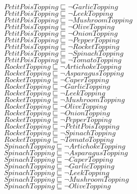 \documentclass[a4paper,10pt]{article}
\begin{document}
 $PetitPoisTopping \sqsubseteq  \lnot GarlicTopping$\\ 
 $PetitPoisTopping \sqsubseteq  \lnot LeekTopping$\\ 
 $PetitPoisTopping \sqsubseteq  \lnot MushroomTopping$\\ 
 $PetitPoisTopping \sqsubseteq  \lnot OliveTopping$\\ 
 $PetitPoisTopping \sqsubseteq  \lnot OnionTopping$\\ 
 $PetitPoisTopping \sqsubseteq  \lnot PepperTopping$\\ 
 $PetitPoisTopping \sqsubseteq  \lnot RocketTopping$\\ 
 $PetitPoisTopping \sqsubseteq  \lnot SpinachTopping$\\ 
 $PetitPoisTopping \sqsubseteq  \lnot TomatoTopping$\\ 
 $RocketTopping \sqsubseteq  \lnot ArtichokeTopping$\\ 
 $RocketTopping \sqsubseteq  \lnot AsparagusTopping$\\ 
 $RocketTopping \sqsubseteq  \lnot CaperTopping$\\ 
 $RocketTopping \sqsubseteq  \lnot GarlicTopping$\\ 
 $RocketTopping \sqsubseteq  \lnot LeekTopping$\\ 
 $RocketTopping \sqsubseteq  \lnot MushroomTopping$\\ 
 $RocketTopping \sqsubseteq  \lnot OliveTopping$\\ 
 $RocketTopping \sqsubseteq  \lnot OnionTopping$\\ 
 $RocketTopping \sqsubseteq  \lnot PepperTopping$\\ 
 $RocketTopping \sqsubseteq  \lnot PetitPoisTopping$\\ 
 $RocketTopping \sqsubseteq  \lnot SpinachTopping$\\ 
 $RocketTopping \sqsubseteq  \lnot TomatoTopping$\\ 
 $SpinachTopping \sqsubseteq  \lnot ArtichokeTopping$\\ 
 $SpinachTopping \sqsubseteq  \lnot AsparagusTopping$\\ 
 $SpinachTopping \sqsubseteq  \lnot CaperTopping$\\ 
 $SpinachTopping \sqsubseteq  \lnot GarlicTopping$\\ 
 $SpinachTopping \sqsubseteq  \lnot LeekTopping$\\ 
 $SpinachTopping \sqsubseteq  \lnot MushroomTopping$\\ 
 $SpinachTopping \sqsubseteq  \lnot OliveTopping$\\ 
\end{document}
